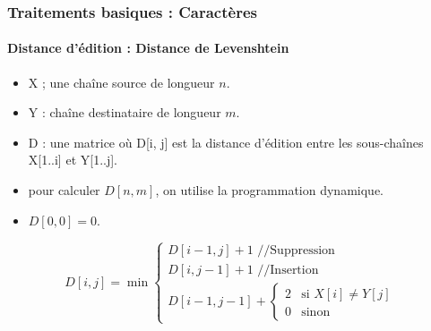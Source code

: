 \documentclass[xcolor=table]{beamer}
\begin{document}
\begin{frame}
\frametitle{Traitements basiques : Caractères}
\framesubtitle{Distance d'édition : Distance de Levenshtein}

\begin{itemize}
	\item X ; une chaîne source de longueur $n$.
	\item Y : chaîne destinataire de longueur $m$.
	\item D : une matrice où D[i, j] est la distance d'édition entre les sous-chaînes X[1..i] et Y[1..j].
	\item pour calculer $D[n, m]$, on utilise la programmation dynamique.
	\item $D[0, 0] = 0$.
\end{itemize}

\[
D[i, j] = \min 
\begin{cases}
D[i - 1, j] + 1 \text{ //Suppression}\\
D[i, j-1] + 1 \text{ //Insertion}\\
D[i-1, j-1] + \begin{cases}
2 & \text{si } X[i] \ne Y[j] \\
0 & \text{sinon}
\end{cases}
\end{cases}
\]

\end{frame}
\end{document}
